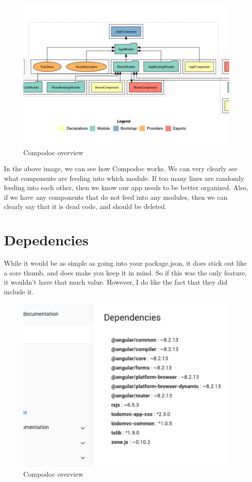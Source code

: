 \begin{figure}[h!]
\caption{Compodoc overview}
\includegraphics[width=414pt]{graphics/compodoc/compodoc-overview-screenshot.pdf}
\end{figure}

In the above image, we can see how Compodoc works. We can very clearly see what components are feeding into which module. If too many lines are randomly feeding into each other, then we know our app needs to be better organized. Also, if we have any components that do not feed into any modules, then we can clearly say that it is dead code, and should be deleted.

\section{Depedencies}
While it would be as simple as going into your package.json, it does stick out like a sore thumb, and does make you keep it in mind. So if this was the only feature, it wouldn't have that much value. However, I do like the fact that they did include it. 
\begin{figure}[h!]
\caption{Compodoc overview}
\includegraphics[width=414pt]{graphics/compodoc/dependencies/compo-dependencies-screenshot.pdf}
\end{figure}

